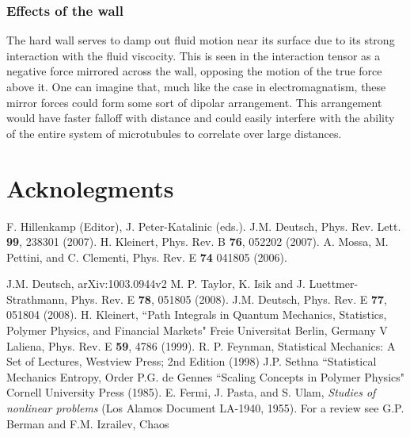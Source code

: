\documentclass[11pt]{ucthesis}
\begin{document}
{\section{Effects of the wall}
The hard wall serves to damp out fluid motion near its surface due to its strong interaction with the fluid viscocity. 
This is seen in the interaction tensor as a negative force mirrored across the wall, opposing the motion of the true force above it.
One can imagine that, much like the case in electromagnatism, these mirror forces could form some sort of dipolar arrangement. 
This arrangement would have faster falloff with distance and could easily interfere with the ability of the entire system of microtubules to correlate over large distances.

\part{Acknolegments}

\begin{thebibliography}{}
 F. Hillenkamp (Editor), J. Peter-Katalinic (eds.). 
 J.M. Deutsch, Phys. Rev. Lett. {\bf 99}, 238301 (2007).
 H. Kleinert, Phys. Rev. B {\bf76}, 052202 (2007). 
 A. Mossa, M. Pettini, and C. Clementi, Phys. Rev. E {\bf 74} 041805 (2006).

 J.M. Deutsch, arXiv:1003.0944v2 
 M. P. Taylor, K. Isik and J. Luettmer-Strathmann,  Phys. Rev. E {\bf 78}, 051805  (2008).
 J.M. Deutsch, Phys. Rev. E {\bf 77}, 051804 (2008).
 H. Kleinert, ``Path Integrals in Quantum Mechanics, Statistics, Polymer Physics, and Financial Markets" Freie Universitat Berlin, Germany
 V Laliena, Phys. Rev. E {\bf 59}, 4786 (1999).
 R. P. Feynman, Statistical Mechanics: A Set of Lectures, Westview Press; 2nd Edition (1998)
 J.P. Sethna ``Statistical Mechanics Entropy, Order
 P.G. de Gennes ``Scaling Concepts in Polymer Physics" Cornell University Press (1985).
 E. Fermi, J. Pasta, and S. Ulam, {\em Studies of nonlinear problems} 
(Los Alamos Document LA-1940, 1955).
 For a review see G.P. Berman and F.M. Izrailev, Chaos





\end{thebibliography}}
\end{document}
